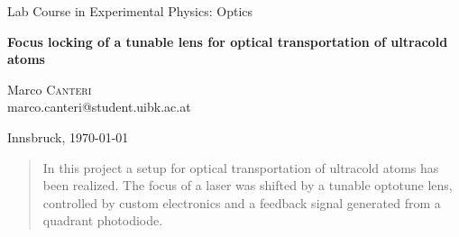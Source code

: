 \documentclass[a4paper,10pt]{article}
\begin{document}
\begin{titlepage}
 \begin{center}
 \Large{Lab Course in Experimental Physics: Optics}
 \end{center}
 \begin{center}
  \LARGE{\textbf{Focus locking of a tunable lens for optical transportation of ultracold atoms}}
 \end{center}
 \begin{center}
 \large Marco \textsc{Canteri} \\
 marco.canteri@student.uibk.ac.at\\
 \end{center}

 \begin{center}
 \vspace{1cm}
 Innsbruck, \today
 \vspace{1cm}
 \end{center}

 \begin{abstract}
In this project a setup for optical transportation of ultracold atoms has been realized. The focus of a laser was shifted by a tunable optotune lens, controlled by custom electronics and a feedback signal generated from a quadrant photodiode.
\end{abstract}
  \vspace{1cm}


\end{titlepage}
\end{document}
